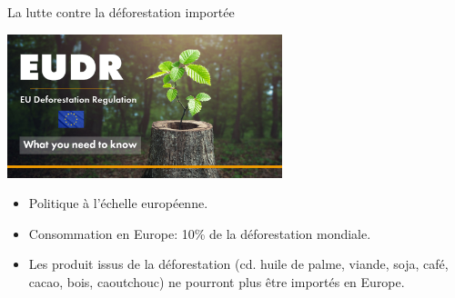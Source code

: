 \documentclass[10pt,table,dvipsnames,compress]{beamer}
\begin{document}
\begin{frame}[label={sec:orgde9b0c3}]{La lutte contre la déforestation importée}
\begin{center}
\includegraphics[width=0.6\textwidth]{figs/eudr-europe.jpg}
\end{center}

\begin{itemize}
\item Politique à l'échelle européenne.
\item Consommation en Europe: 10\% de la déforestation mondiale.
\item Les produit issus de la déforestation (cd. huile de palme, viande, soja, café, cacao, bois, caoutchouc) ne pourront plus être importés en Europe.
\end{itemize}
\end{frame}
\end{document}
